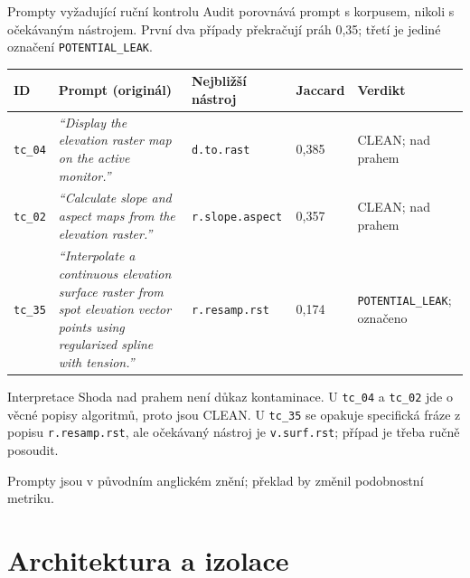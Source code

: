 \documentclass[aspectratio=169,11pt]{beamer}
\begin{document}
\begin{frame}[t]{Prompty vyžadující ruční kontrolu}
  \footnotesize
  \noindent Audit porovnává prompt s korpusem, nikoli s očekávaným nástrojem.
  První dva případy překračují práh 0{,}35; třetí je jediné označení
  \texttt{POTENTIAL\_LEAK}.

  \vspace{1mm}
  {\renewcommand{\arraystretch}{0.92}
  \begin{table}
    \centering
    \begin{tabular}{@{}p{1.0cm}p{5.7cm}p{2.4cm}p{1.0cm}p{2.1cm}@{}}
      \toprule
      \textbf{ID} & \textbf{Prompt (originál)} & \textbf{Nejbližší nástroj}
        & \textbf{Jaccard} & \textbf{Verdikt} \\
      \midrule
      \texttt{tc\_04}
        & \textit{``Display the elevation raster map on the active monitor.''}
        & \texttt{d.to.rast} & 0{,}385 & CLEAN; nad prahem \\
      \texttt{tc\_02}
        & \textit{``Calculate slope and aspect maps from the elevation raster.''}
        & \texttt{r.slope.aspect} & 0{,}357 & CLEAN; nad prahem \\
      \texttt{tc\_35}
        & \textit{``Interpolate a continuous elevation surface raster from spot elevation vector points using regularized spline with tension.''}
        & \texttt{r.resamp.rst} & 0{,}174
        & \texttt{POTENTIAL\_LEAK}; označeno \\
      \bottomrule
    \end{tabular}
  \end{table}}

  \begin{block}{Interpretace}
    Shoda nad prahem není důkaz kontaminace. U \texttt{tc\_04} a \texttt{tc\_02}
    jde o věcné popisy algoritmů, proto jsou CLEAN. U \texttt{tc\_35} se opakuje
    specifická fráze z popisu \texttt{r.resamp.rst}, ale očekávaný nástroj je
    \texttt{v.surf.rst}; případ je třeba ručně posoudit.
  \end{block}

  {\scriptsize Prompty jsou v původním anglickém znění; překlad by změnil
  podobnostní metriku.}
\end{frame}

\section{Architektura a izolace}
\end{document}
